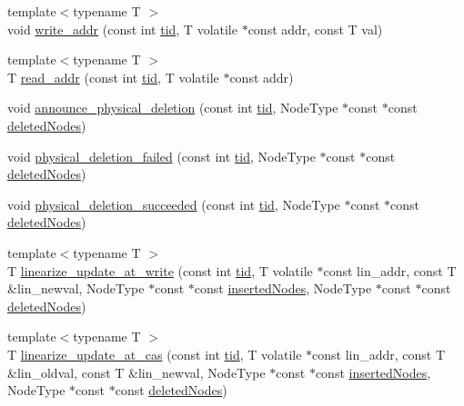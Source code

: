 \begin{DoxyCompactItemize}
\item 
{\footnotesize template$<$typename T $>$ }\\void \hyperlink{classRQProvider_a2b627a253e65ffdbba9815d0ac3236cb}{write\+\_\+addr} (const int \hyperlink{microbench_2main_8cpp_a9ca9869868fe7e7a38a921cc7de4103f}{tid}, T volatile $\ast$const addr, const T val)
\item 
{\footnotesize template$<$typename T $>$ }\\T \hyperlink{classRQProvider_aa6dcae307b83ce0dc7890155f81659a2}{read\+\_\+addr} (const int \hyperlink{microbench_2main_8cpp_a9ca9869868fe7e7a38a921cc7de4103f}{tid}, T volatile $\ast$const addr)
\item 
void \hyperlink{classRQProvider_a29337e6766144d1c1a9aa752fe73fabf}{announce\+\_\+physical\+\_\+deletion} (const int \hyperlink{microbench_2main_8cpp_a9ca9869868fe7e7a38a921cc7de4103f}{tid}, Node\+Type $\ast$const $\ast$const \hyperlink{scxrecord_8h_ae536bce1bb8c0fffd7a3053f7d258f1e}{deleted\+Nodes})
\item 
void \hyperlink{classRQProvider_a1fb29a074556e0431ed22f2bee394c22}{physical\+\_\+deletion\+\_\+failed} (const int \hyperlink{microbench_2main_8cpp_a9ca9869868fe7e7a38a921cc7de4103f}{tid}, Node\+Type $\ast$const $\ast$const \hyperlink{scxrecord_8h_ae536bce1bb8c0fffd7a3053f7d258f1e}{deleted\+Nodes})
\item 
void \hyperlink{classRQProvider_a1bcce8dc80c1661b549a5ec6f9ee6d15}{physical\+\_\+deletion\+\_\+succeeded} (const int \hyperlink{microbench_2main_8cpp_a9ca9869868fe7e7a38a921cc7de4103f}{tid}, Node\+Type $\ast$const $\ast$const \hyperlink{scxrecord_8h_ae536bce1bb8c0fffd7a3053f7d258f1e}{deleted\+Nodes})
\item 
{\footnotesize template$<$typename T $>$ }\\T \hyperlink{classRQProvider_a632161f99e9c5792c70340e621ed22fd}{linearize\+\_\+update\+\_\+at\+\_\+write} (const int \hyperlink{microbench_2main_8cpp_a9ca9869868fe7e7a38a921cc7de4103f}{tid}, T volatile $\ast$const lin\+\_\+addr, const T \&lin\+\_\+newval, Node\+Type $\ast$const $\ast$const \hyperlink{scxrecord_8h_a0f26579d4b35e2dad20ee190a7986d08}{inserted\+Nodes}, Node\+Type $\ast$const $\ast$const \hyperlink{scxrecord_8h_ae536bce1bb8c0fffd7a3053f7d258f1e}{deleted\+Nodes})
\item 
{\footnotesize template$<$typename T $>$ }\\T \hyperlink{classRQProvider_a234b9ee35646cdff3d751df16424a57e}{linearize\+\_\+update\+\_\+at\+\_\+cas} (const int \hyperlink{microbench_2main_8cpp_a9ca9869868fe7e7a38a921cc7de4103f}{tid}, T volatile $\ast$const lin\+\_\+addr, const T \&lin\+\_\+oldval, const T \&lin\+\_\+newval, Node\+Type $\ast$const $\ast$const \hyperlink{scxrecord_8h_a0f26579d4b35e2dad20ee190a7986d08}{inserted\+Nodes}, Node\+Type $\ast$const $\ast$const \hyperlink{scxrecord_8h_ae536bce1bb8c0fffd7a3053f7d258f1e}{deleted\+Nodes})

\end{DoxyCompactItemize}
